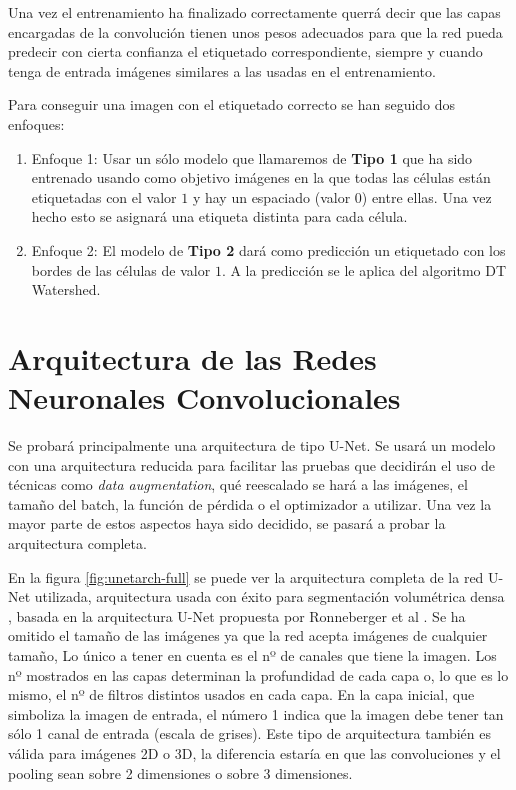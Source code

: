 
Una vez el entrenamiento ha finalizado correctamente querrá decir que las capas encargadas de la convolución tienen unos pesos adecuados para que la red pueda predecir con cierta confianza el etiquetado correspondiente, siempre y cuando tenga de entrada imágenes similares a las usadas en el entrenamiento.

Para conseguir una imagen con el etiquetado correcto se han seguido dos enfoques:
\begin{enumerate}
\item Enfoque 1: Usar un sólo modelo que llamaremos de \textbf{Tipo 1} que ha sido entrenado usando como objetivo imágenes en la que todas las células están etiquetadas con el valor $ 1 $ y hay un espaciado (valor $ 0 $) entre ellas. Una vez hecho esto se asignará una etiqueta distinta para cada célula.
\item Enfoque 2: El modelo de \textbf{Tipo 2} dará como predicción un etiquetado con los bordes de las células de valor $ 1 $. A la predicción se le aplica del algoritmo DT Watershed.
\end{enumerate}

\pagebreak \section{Arquitectura de las Redes Neuronales Convolucionales}\label{sec:cnn_arch}

Se probará principalmente una arquitectura de tipo U-Net. Se usará un modelo con una arquitectura reducida para facilitar las pruebas que decidirán el uso de técnicas como \textit{data augmentation}, qué reescalado se hará a las imágenes, el tamaño del batch, la función de pérdida o el optimizador a utilizar. Una vez la mayor parte de estos aspectos haya sido decidido, se pasará a probar la arquitectura completa.

En la figura \ref{fig:unetarch-full} se puede ver la arquitectura completa de la red U-Net utilizada, arquitectura usada con éxito para segmentación volumétrica densa \cite{Cicek2016}, basada en la arquitectura U-Net propuesta por Ronneberger et al \cite{Ronneberger2015}. Se ha omitido el tamaño de las imágenes ya que la red acepta imágenes de cualquier tamaño, Lo único a tener en cuenta es el nº de canales que tiene la imagen. Los nº mostrados en las capas determinan la profundidad de cada capa o, lo que es lo mismo, el nº de filtros distintos usados en cada capa. En la capa inicial, que simboliza la imagen de entrada, el número 1 indica que la imagen debe tener tan sólo 1 canal de entrada (escala de grises). Este tipo de arquitectura también es válida para imágenes 2D o 3D, la diferencia estaría en que las convoluciones y el pooling sean sobre 2 dimensiones o sobre 3 dimensiones.

